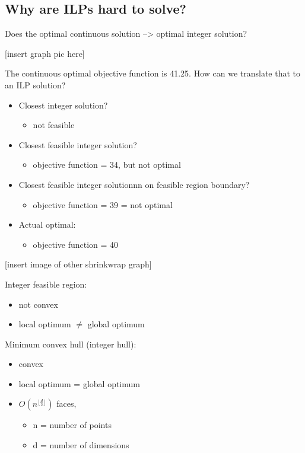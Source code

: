 \documentclass[11pt]{article}
\begin{document}
\subsection{Why are ILPs hard to solve?}
\label{sec:orgd35b919}

Does the optimal continuous solution --> optimal integer solution?

[insert graph pic here]

The continuous optimal objective function is 41.25. How can we translate that to an ILP solution?
\begin{itemize}
\item Closest integer solution?
\begin{itemize}
\item not feasible
\end{itemize}
\item Closest feasible integer solution?
\begin{itemize}
\item objective function = 34, but not optimal
\end{itemize}
\item Closest feasible integer solutionnn on feasible region boundary?
\begin{itemize}
\item objective function = 39 = not optimal
\end{itemize}
\item Actual optimal:
\begin{itemize}
\item objective function = 40
\end{itemize}
\end{itemize}

[insert image of other shrinkwrap graph]

Integer feasible region:
\begin{itemize}
\item not convex
\item local optimum \(\neq\) global optimum
\end{itemize}


Minimum convex hull (integer hull):
\begin{itemize}
\item convex
\item local optimum = global optimum
\item \(O(n^{\lfloor \frac{d}{2} \rfloor})\) faces,
\begin{itemize}
\item n = number of points
\item d = number of dimensions
\end{itemize}
\end{itemize}
\end{document}
